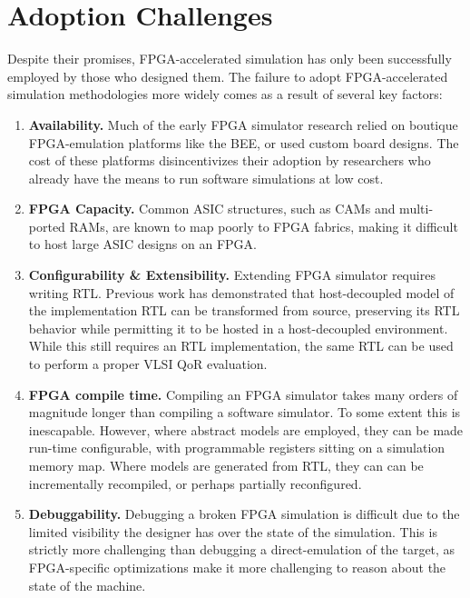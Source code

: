 \section{Adoption Challenges}

Despite their promises, FPGA-accelerated simulation has only been successfully employed by
those who designed them. The failure to adopt FPGA-accelerated simulation
methodologies more widely comes as a result of several key factors:

\begin{enumerate}

    \item \textbf{Availability.} Much of the early FPGA simulator research
        relied on boutique FPGA-emulation platforms like the BEE\cite{bee2}, or
        used custom board designs. The cost of these platforms disincentivizes
        their adoption by researchers who already have the means to run
        software simulations at low cost.

    \item \textbf{FPGA Capacity.} Common ASIC structures, such as CAMs and
        multi-ported RAMs, are known to map poorly to FPGA
        fabrics\cite{fpgagap, fpgagap2}, making it difficult to host large
        ASIC designs on an FPGA.

    \item \textbf{Configurability \& Extensibility.} Extending FPGA simulator
        requires writing RTL.
        Previous work\cite{fabscalarfpga, strober} has demonstrated that
        host-decoupled model of the implementation RTL can be transformed from
        source, preserving its RTL behavior while permitting it to be hosted
        in a host-decoupled environment. While this still requires an RTL
        implementation, the same RTL can be used to perform a proper VLSI QoR
        evaluation.

    \item \textbf{FPGA compile time.} Compiling an FPGA simulator takes many
        orders of magnitude longer than compiling a software simulator.
        To some extent this is inescapable. However, where abstract models are
        employed, they can be made run-time configurable, with programmable
        registers sitting on a simulation memory map. Where models are
        generated from RTL, they can can be incrementally recompiled, or perhaps
        partially reconfigured.

    \item \textbf{Debuggability.} Debugging a broken FPGA simulation is
        difficult due to the limited visibility the designer has over the state
        of the simulation. This is strictly more challenging than debugging a
        direct-emulation of the target, as FPGA-specific optimizations make it more
        challenging to reason about the state of the machine.

\end{enumerate}

